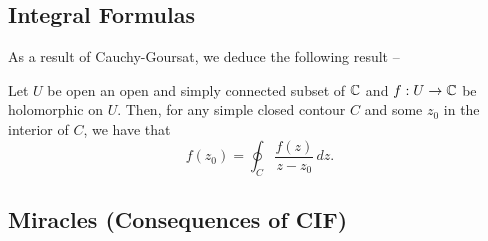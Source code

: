 \subsection{Integral Formulas}
As a result of Cauchy-Goursat, we deduce the following result --
\begin{theorem}
  Let $U$ be open an open and simply connected subset of $\mathbb C$ and $f : U \to \mathbb C$ be holomorphic on $U$. Then, for any simple closed contour $C$ and some $z_0$ in the interior of $C$, we have that \[f(z_0) = \oint_C \frac{f(z)}{z-z_0} \, dz. \]
\end{theorem}

\subsection{Miracles (Consequences of CIF)}